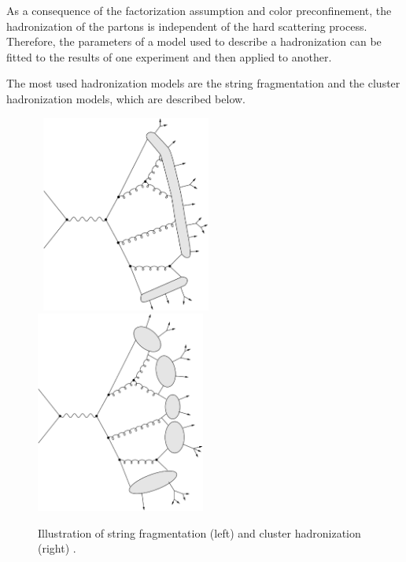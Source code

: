 As a consequence of the factorization assumption and color preconfinement, the hadronization of the partons is independent of the hard scattering process.
Therefore, the parameters of a model used to describe a hadronization can be fitted to the results of one experiment and then applied to another.

The most used hadronization models are the string fragmentation and the cluster hadronization models, which are described below.

\begin{figure}[!ht]
  \begin{center}
    \mbox{
        \includegraphics[width=0.495\textwidth]{StandardModel/Figures/HadronizationString.eps}
        \includegraphics[width=0.495\textwidth]{StandardModel/Figures/HadronizationCluster.eps}
    }
  \end{center}
  \caption[Illustration of different hadronization models.]{Illustration of string fragmentation (left) and cluster hadronization (right) \protect\cite{Ellis:1991qj}.}
  \label{fig:HadronizationModels}
\end{figure}


